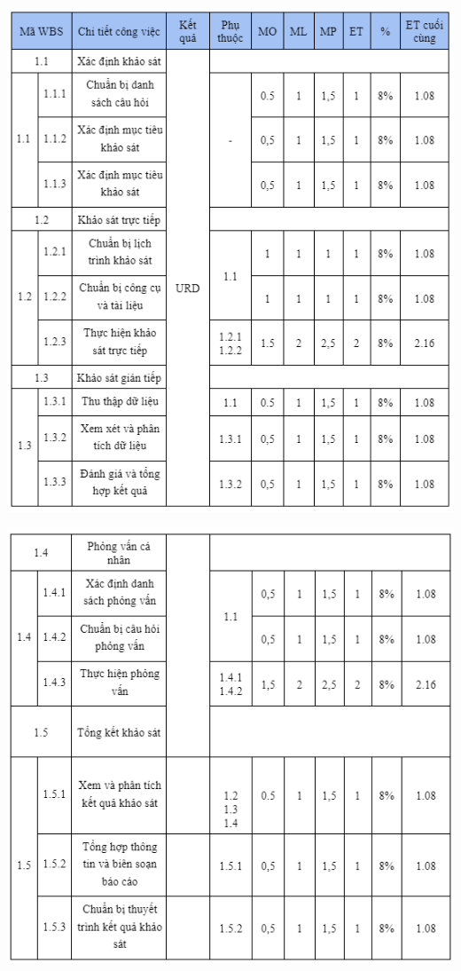 \documentclass[12pt]{article}
\begin{document}
\includegraphics[width=14.5cm]{ThoiGian1_1.png}
\par
\includegraphics[width=14.5cm]{ThoiGian1_2.png}
\vspace{0.5cm}
\end{document}
